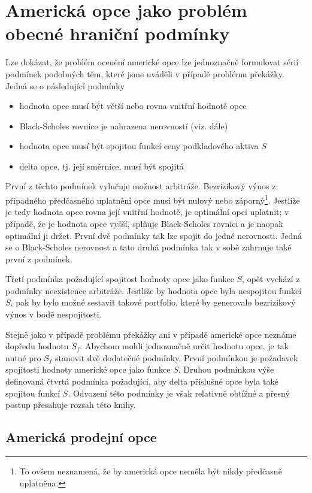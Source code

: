 \documentclass[a4paper]{book}
\begin{document}
\section{Americká opce jako problém obecné hraniční podmínky}

Lze dokázat, že problém ocenění americké opce lze jednoznačně formulovat sérií podmínek podobných těm, které jsme uváděli v případě problému překážky. Jedná se o následující podmínky
\begin{itemize}
\item hodnota opce musí být větší nebo rovna vnitřní hodnotě opce
\item Black-Scholes rovnice je nahrazena nerovností (viz. dále)
\item hodnota opce musí být spojitou funkcí ceny podkladového aktiva $S$
\item delta opce, tj. její směrnice, musí být spojitá
\end{itemize}
První z těchto podmínek vylučuje možnost arbitráže. Bezrizikový výnos z případného předčasného uplatnění opce musí být nulový nebo záporný\footnote{To ovšem neznamená, že by americká opce neměla být nikdy předčasně uplatněna.}. Jestliže je tedy hodnota opce rovna její vnitřní hodnotě, je optimální opci uplatnit; v případě, že je hodnota opce vyšší, splňuje Black-Scholes rovnici a je naopak optimální ji držet. První dvě podmínky tak lze spojit do jedné nerovnosti. Jedná se o Black-Scholes nerovnost a tato druhá podmínka tak v sobě zahrnuje také první z podmínek.

Třetí podmínka požadující spojitost hodnoty opce jako funkce $S$, opět vychází z podmínky neexistence arbitráže. Jestliže by hodnota opce byla nespojitou funkcí $S$, pak by bylo možné sestavit takové portfolio, které by generovalo bezrizikový výnos v bodě nespojitosti.

Stejně jako v případě problému překážky ani v případě americké opce neznáme dopředu hodnotu $S_f$. Abychom mohli jednoznačně určit hodnotu opce, je tak nutné pro $S_f$ stanovit dvě dodatečné podmínky. První podmínkou je požadavek spojitosti hodnoty americké opce jako funkce $S$. Druhou podmínkou výše definovaná čtvrtá podmínka požadující, aby delta příslušné opce byla také spojitou funkcí $S$. Odvození této podmínky je však relativně obtížné a přesný postup přesahuje rozsah této knihy.

\subsection{Americká prodejní opce}
\end{document}
